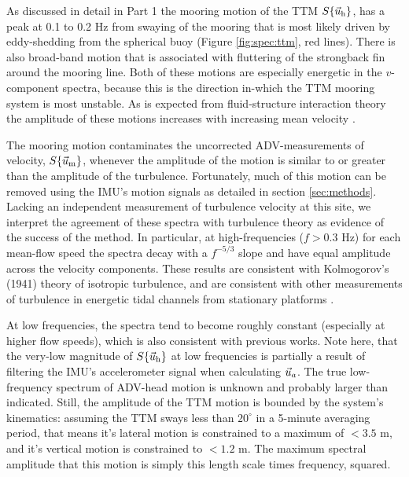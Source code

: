 As discussed in detail in Part 1 the mooring motion of the TTM $S\{\vec{u}_\mathrm{h}\}$, has a peak at 0.1 to 0.2 Hz from swaying of the mooring that is most likely driven by eddy-shedding from the spherical buoy (Figure \ref{fig:spec:ttm}, red lines). There is also broad-band motion that is associated with fluttering of the strongback fin around the mooring line. Both of these motions are especially energetic in the $v$-component spectra, because this is the direction in-which the TTM mooring system is most unstable. As is expected from fluid-structure interaction theory the amplitude of these motions increases with increasing mean velocity \cite[]{Morison++1950}.

The mooring motion contaminates the uncorrected ADV-measurements of velocity, $S\{\vec{u}_\mathrm{m}\}$, whenever the amplitude of the motion is similar to or greater than the amplitude of the turbulence. Fortunately, much of this motion can be removed using the IMU's motion signals as detailed in section \ref{sec:methods}. Lacking an independent measurement of turbulence velocity at this site, we interpret the agreement of these spectra with turbulence theory as evidence of the success of the method. In particular, at high-frequencies ($f>0.3$ Hz) for each mean-flow speed the spectra decay with a $f^{-5/3}$ slope and have equal amplitude across the velocity components. These results are consistent with Kolmogorov's (1941) theory of isotropic turbulence, and are consistent with other measurements of turbulence in energetic tidal channels from stationary platforms \citep[]{Kolmogorov1941c,Walter++2011,Thomson++2012,McMillan++2016}.

At low frequencies, the spectra tend to become roughly constant (especially at higher flow speeds), which is also consistent with previous works. Note here, that the very-low magnitude of $S\{\vec{u}_\mathrm{h}\}$ at low frequencies is partially a result of filtering the IMU's accelerometer signal when calculating $\vec{u}_a$. The true low-frequency spectrum of ADV-head motion is unknown and probably larger than indicated. Still, the amplitude of the TTM motion is bounded by the system's kinematics: assuming the TTM sways less than $20^\circ$ in a 5-minute averaging period, that means it's lateral motion is constrained to a maximum of $<3.5$ m, and it's vertical motion is constrained to $<1.2$ m. The maximum spectral amplitude that this motion is simply this length scale times frequency, squared.

